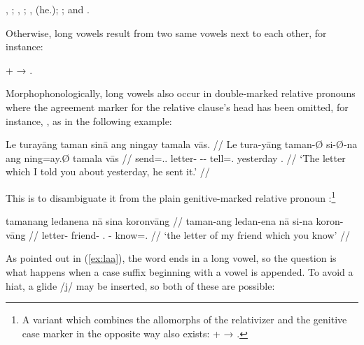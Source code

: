 \pex
	\a {}, ;
	\a {}, ;
	\a {},  (he.\Aarg{}); \label{ex:laa}
	\a {}; and 
	\a {}.\footnotemark
\xe
{}

\noindent Otherwise, long vowels result from two same vowels next to each other, 
for instance:

\ex
	 +  → 
	.\label{ex:longvwls}
\xe

Morphophonologically, long vowels also occur in double-marked relative pronouns 
where the agreement marker for the relative clause's head has been omitted,
for instance, , as in the following 
example:\label{doublerel}

\ex\begingl
	\gla Le turayāng taman sinā ang ningay tamala vās. //
	\glb Le tura-yāng taman-Ø si-Ø-na ang ning=ay.Ø tamala vās //
	\glc \PatTI{} send=\Tsg{}.\M{}.\Aarg{} letter-\Top{} \Rel{}-\PatTI{}-\Gen{} \AgtT{} tell=\Fsg{}.\Top{} yesterday \Ssg{}.\Parg{} //
	\glft `The letter which I told you about yesterday, he sent it.' //
\endgl\xe

This is to disambiguate it from the plain genitive-marked relative pronoun 
:\footnote{A variant which combines the 
allomorphs of the relativizer and the genitive case marker in the opposite way 
also exists:  +  → .}

\ex\begingl
	\gla tamanang ledanena nā sina koronvāng //
	\glb taman-ang ledan-ena nā si-na koron-vāng //
	\glc letter-\Aarg{} friend-\Gen{} \Fsg.\Gen{} \Rel{}-\Gen{} know=\Ssg{}.\Aarg{} //
	\glft `the letter of my friend which you know' //
\endgl\xe

As pointed out in (\ref{ex:laa}), the word  ends in a 
long vowel, so the question is what happens when a case suffix beginning with a 
vowel is appended. To avoid a hiat, a glide /j/ may be inserted, so both of 
these are possible:


